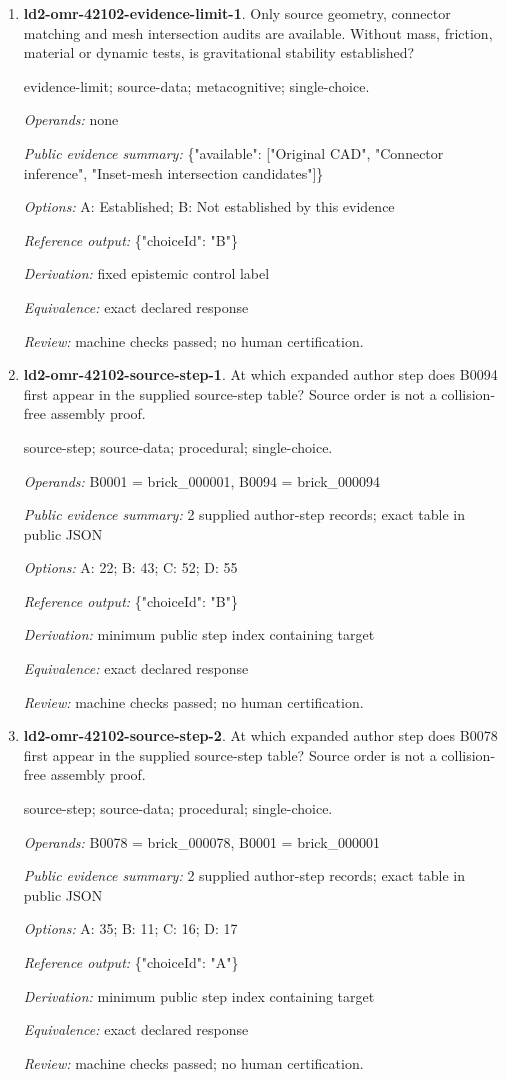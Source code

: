 \begin{enumerate}
\item \textbf{ld2-omr-42102-evidence-limit-1}. Only source geometry, connector matching and mesh intersection audits are available. Without mass, friction, material or dynamic tests, is gravitational stability established?
\par{\small evidence-limit; source-data; metacognitive; single-choice.\par\textit{Operands:} none\par\textit{Public evidence summary:} \{"available": ["Original CAD", "Connector inference", "Inset-mesh intersection candidates"]\}\par\textit{Options:} A: Established; B: Not established by this evidence\par\textit{Reference output:} \{"choiceId": "B"\}\par\textit{Derivation:} fixed epistemic control label\par\textit{Equivalence:} exact declared response\par\textit{Review:} machine checks passed; no human certification.}
\item \textbf{ld2-omr-42102-source-step-1}. At which expanded author step does B0094 first appear in the supplied source-step table? Source order is not a collision-free assembly proof.
\par{\small source-step; source-data; procedural; single-choice.\par\textit{Operands:} B0001 = brick\_000001, B0094 = brick\_000094\par\textit{Public evidence summary:} 2 supplied author-step records; exact table in public JSON\par\textit{Options:} A: 22; B: 43; C: 52; D: 55\par\textit{Reference output:} \{"choiceId": "B"\}\par\textit{Derivation:} minimum public step index containing target\par\textit{Equivalence:} exact declared response\par\textit{Review:} machine checks passed; no human certification.}
\item \textbf{ld2-omr-42102-source-step-2}. At which expanded author step does B0078 first appear in the supplied source-step table? Source order is not a collision-free assembly proof.
\par{\small source-step; source-data; procedural; single-choice.\par\textit{Operands:} B0078 = brick\_000078, B0001 = brick\_000001\par\textit{Public evidence summary:} 2 supplied author-step records; exact table in public JSON\par\textit{Options:} A: 35; B: 11; C: 16; D: 17\par\textit{Reference output:} \{"choiceId": "A"\}\par\textit{Derivation:} minimum public step index containing target\par\textit{Equivalence:} exact declared response\par\textit{Review:} machine checks passed; no human certification.}

\end{enumerate}
